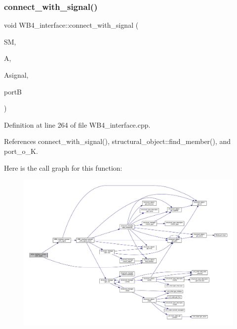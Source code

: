 \subsubsection{\texorpdfstring{connect\+\_\+with\+\_\+signal()}{connect\_with\_signal()}\hspace{0.1cm}{\footnotesize\ttfamily [4/4]}}
{\footnotesize\ttfamily void W\+B4\+\_\+interface\+::connect\+\_\+with\+\_\+signal (\begin{DoxyParamCaption}\item[{\hyperlink{structural__manager_8hpp_ab3136f0e785d8535f8d252a7b53db5b5}{structural\+\_\+manager\+Ref}}]{SM,  }\item[{\hyperlink{structural__objects_8hpp_a8ea5f8cc50ab8f4c31e2751074ff60b2}{structural\+\_\+object\+Ref}}]{A,  }\item[{std\+::string}]{Asignal,  }\item[{\hyperlink{structural__objects_8hpp_a8ea5f8cc50ab8f4c31e2751074ff60b2}{structural\+\_\+object\+Ref}}]{portB }\end{DoxyParamCaption})\hspace{0.3cm}{\ttfamily [protected]}}



Definition at line 264 of file W\+B4\+\_\+interface.\+cpp.



References connect\+\_\+with\+\_\+signal(), structural\+\_\+object\+::find\+\_\+member(), and port\+\_\+o\+\_\+K.

Here is the call graph for this function\+:
\nopagebreak
\begin{figure}[H]
\begin{center}
\leavevmode
\includegraphics[width=350pt]{d5/d7a/classWB4__interface_afc00c384ae6bf15c37a096f03693f026_cgraph}
\end{center}
\end{figure}
\mbox{\label{classWB4__interface_ae026b1e7a0037505afcc162c99dbc4ac}} 
